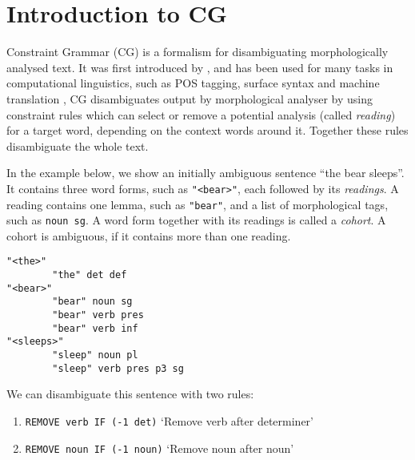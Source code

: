 \def\t#1{\texttt{#1}}

\section{Introduction to CG}
 

Constraint Grammar (CG) is a formalism for 
disambiguating morphologically analysed text. 
It was first introduced by
\cite{karlsson1995constraint}, and has been used for many tasks in
computational linguistics, such as POS tagging, surface syntax and
machine translation \cite{bick2011},
CG disambiguates output by morphological analyser by using
constraint rules which can select or remove a potential analysis (called \emph{reading})
for a target word, depending on the context words around it. 
Together these rules disambiguate the whole text.


In the example below, we show an initially ambiguous sentence ``the bear
sleeps''. 
It contains three word forms, such as \t{"<bear>"}, each followed by its \emph{readings}.
A reading contains one lemma, such as \t{"bear"}, and a list of morphological tags, such as \t{noun sg}.
A word form together with its readings is called a \emph{cohort}. A cohort is ambiguous, if it contains more than one reading.


\begin{center}
\begin{verbatim}
"<the>"
        "the" det def
"<bear>"
        "bear" noun sg
        "bear" verb pres
        "bear" verb inf
"<sleeps>"
        "sleep" noun pl
        "sleep" verb pres p3 sg
\end{verbatim}
\end{center}


\noindent We can disambiguate this sentence with two rules:

\begin{enumerate}
\def\labelenumi{\arabic{enumi}.}
\itemsep1pt\parskip0pt
\item \texttt{REMOVE verb IF (-1 det)}
  `Remove verb after determiner'
\item  \texttt{REMOVE noun IF (-1 noun)}
  `Remove noun after noun'
\end{enumerate}

